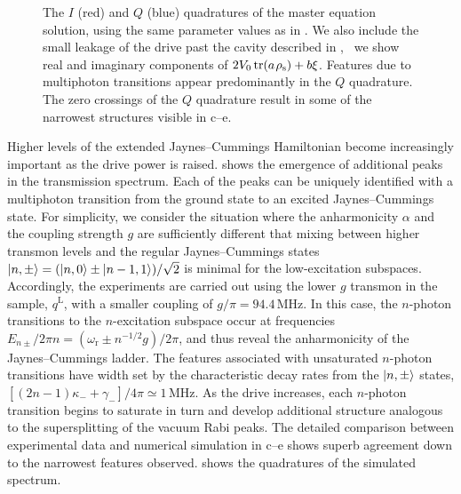 \begin{figure}
 \centering
 \caption[Quadratures of $\sqrt{n}$ peaks under strong driving of the vacuum Rabi transition]
 { The $I$ (red) and $Q$ (blue) quadratures of the master equation~ solution, using the same parameter values as in . We also include the small leakage of the drive past the cavity described in , \ie\ we show real and imaginary components of $2V_0\operatorname{tr}(a\mspace{1.5mu}\rho_\text{s})+b\xi$. Features due to multiphoton transitions appear predominantly in the $Q$ quadrature. The zero crossings of the $Q$ quadrature result in some of the narrowest structures visible in c--e.\label{fig:hirelim3}}
 \end{figure}%
Higher levels of the extended Jaynes--Cummings Hamiltonian become increasingly important as the drive power is raised.  shows the emergence of additional peaks in the transmission spectrum. Each of the peaks can be uniquely identified with a multiphoton transition from the ground state to an excited Jaynes--Cummings state. For simplicity, we consider the situation where the anharmonicity $\alpha$ and the coupling strength $g$ are sufficiently different that mixing between higher transmon levels and the regular Jaynes--Cummings states $\left\lvert n,\pm \right\rangle=(\left\lvert n,0 \right\rangle\pm\left\lvert n-1,1 \right\rangle)/\sqrt{2}$ is minimal for the low-excitation subspaces. Accordingly, the experiments are carried out using the lower $g$  transmon in the sample, $q^\text{L}$, with a smaller coupling of $g/\pi=94.4\,\text{MHz}$. In this case, the $n$-photon transitions to the $n$-excitation subspace occur at frequencies $E_{n\pm}/2\pi n=(\omega_\text{r}\pm n^{-1/2}g)/2\pi$, and thus reveal the anharmonicity of the Jaynes--Cummings ladder. The features associated with unsaturated $n$-photon transitions have width set by the characteristic decay rates from the $\left\lvert n,\pm \right\rangle$ states, $[(2n-1)\kappa_-+\gamma_-]/4\pi\simeq 1\,\text{MHz}$. As the drive increases, each $n$-photon transition begins to saturate in turn and develop additional structure analogous to the supersplitting of the vacuum Rabi peaks. The detailed comparison between experimental data and numerical simulation in c--e shows superb agreement down to the narrowest features observed.  shows the quadratures of the simulated spectrum.

